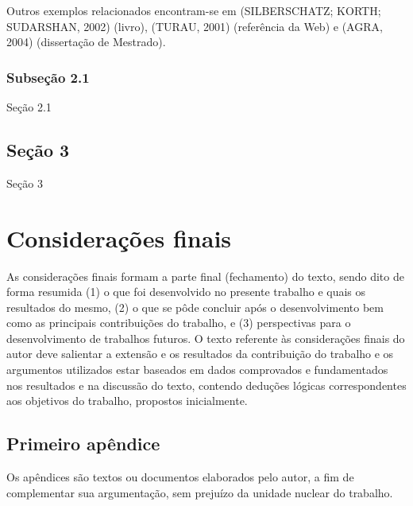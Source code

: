 \documentclass[
	12pt,				%
	openright,			%
	oneside,	
	a4paper,				%
	english,				%
	brazil				%
]{abntex2/abntex2} %
\begin{document}
		Outros exemplos relacionados encontram-se em (SILBERSCHATZ; KORTH; SUDARSHAN, 2002) (livro), (TURAU, 2001) (referência da Web) e (AGRA, 2004) (dissertação de Mestrado).

		\subsection{Subseção 2.1}
	
			Seção 2.1
			
	\section{Seção 3}
	
		Seção 3
		
\chapter{Considerações finais}

	As considerações finais formam a parte final (fechamento) do texto, sendo dito de forma resumida (1) o que foi desenvolvido no presente trabalho e quais os resultados do mesmo, (2) o que se pôde concluir após o desenvolvimento bem como as principais contribuições do trabalho, e (3) perspectivas para o desenvolvimento de trabalhos futuros. O texto referente às considerações finais do autor deve salientar a extensão e os resultados da contribuição do trabalho e os argumentos utilizados estar baseados em dados comprovados e fundamentados nos resultados e na discussão do texto, contendo deduções lógicas correspondentes aos objetivos do trabalho, propostos inicialmente.

\postextual
{}



\begin{apendicesenv}

\chapter{Primeiro apêndice}

Os apêndices são textos ou documentos elaborados pelo autor, a fim de complementar sua argumentação, sem prejuízo da unidade nuclear do trabalho.

\end{apendicesenv}
\end{document}
